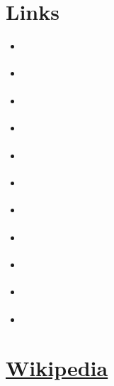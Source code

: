 \documentclass[11pt]{article}%
\begin{document}
\section{Links}

\begin{itemize}

 \item \parencite{web:chars-74k}
 \item \parencite{web:chars-74k-hand-drawn}
 \item \parencite{web:equation-editor}
 \item \parencite{web:history-binomial}
 \item \parencite{web:license-maker}
 \item \parencite{web:ecs}
 \item \parencite{web:pact-adp}
 \item \parencite{web:pact-ce21-2013}
 \item \parencite{web:7-big-ideas}
 \item \parencite{web:5-cs}
 \item \parencite{web:national-imperative-k12-csed}

\end{itemize}

\section{\href{https://wikipedia.com/}{Wikipedia}}
\end{document}

